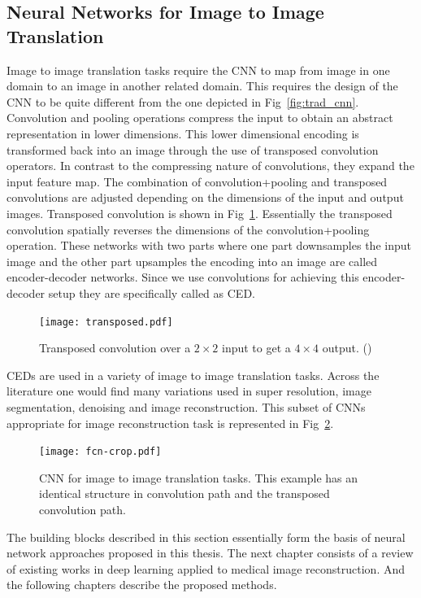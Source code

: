 \subsection{Neural Networks for Image to Image Translation}

Image to image translation tasks require the \ac{CNN} to map from image in one domain to an image in another related domain. This requires the design of the \ac{CNN} to be quite different from the one depicted in Fig~\ref{fig:trad_cnn}. Convolution and pooling operations compress the input to obtain an abstract representation in lower dimensions. This lower dimensional encoding is transformed back into an image through the use of transposed convolution operators. In contrast to the compressing nature of convolutions, they expand the input feature map. The combination of convolution+pooling and transposed convolutions are adjusted depending on the dimensions of the input and output images. Transposed convolution is shown in Fig~\ref{fig:tc}. Essentially the transposed convolution spatially reverses the dimensions of the convolution+pooling operation. These networks with two parts where one part downsamples the input image and the other part upsamples the encoding into an image are called encoder-decoder networks. Since we use convolutions for achieving this encoder-decoder setup they are specifically called as \acf{CED}. 

\begin{figure}[!htbp]
	\centering
	\texttt{[image: transposed.pdf]}
	\caption{Transposed convolution over a $2\times2$ input to get a $4\times4$ output. (\cite{dumoulin2016guide})}
	\label{fig:tc}
\end{figure}

\acp{CED} are used in a variety of image to image translation tasks. Across the literature one would find many variations used in super resolution, image segmentation, denoising and image reconstruction. This subset of \acp{CNN} appropriate for image reconstruction task is represented in Fig~\ref{fig:ced}. 

\begin{figure}[!htbp]
	\centering
	\texttt{[image: fcn-crop.pdf]}
	\caption{\ac{CNN} for image to image translation tasks. This example has an identical structure in convolution path and the transposed convolution path.}
	\label{fig:ced}
\end{figure}

The building blocks described in this section essentially form the basis of neural network approaches proposed in this thesis. The next chapter consists of a review of existing works in deep learning applied to medical image reconstruction. And the following chapters describe the proposed methods. 



